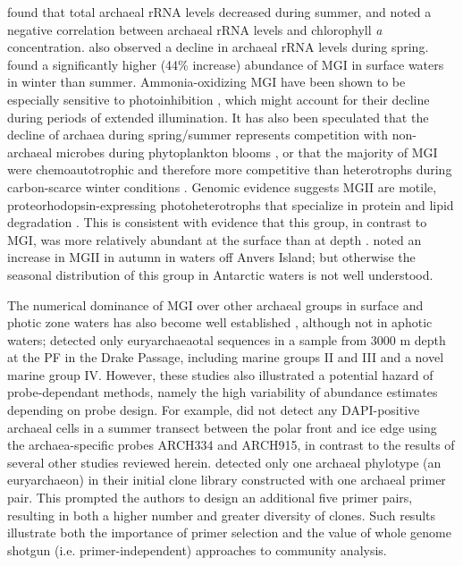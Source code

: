 \citet{Murray:1998wy} found that total archaeal rRNA levels decreased during summer, and noted a negative correlation between archaeal rRNA levels and chlorophyll \emph{a} concentration.
\citet{Massana:1998tn} also observed a decline in archaeal rRNA levels during spring.
\citet{Church:2003vt} found a significantly higher (44\% increase) abundance of \ac{MGI} in surface waters in winter than summer.
Ammonia-oxidizing \ac{MGI} have been shown to be especially sensitive to photoinhibition \cite{Merbt:2011bl}, which might account for their decline during periods of extended illumination.
It has also been speculated that the decline of archaea during spring/summer represents competition with non-archaeal microbes during phytoplankton blooms \cite{Massana:1998tn}, or that the majority of \ac{MGI} were chemoautotrophic and therefore more competitive than heterotrophs during carbon-scarce winter conditions \cite{Murray:1998wy}.
Genomic evidence suggests \ac{MGII} are motile, proteorhodopsin-expressing photoheterotrophs that specialize in protein and lipid degradation \cite{Iverson:2012kc}.
This is consistent with evidence that this group, in contrast to \ac{MGI}, was more relatively abundant at the surface than at depth \cite{Massana:1998tn}.
\citet{Murray:1998wy} noted an increase in \ac{MGII} in autumn in waters off Anvers Island; but otherwise the seasonal distribution of this group in Antarctic waters is not well understood.

The numerical dominance of \ac{MGI} over other archaeal groups in surface and photic zone waters has also become well established \citep[e.g.][]{DeLong:1994id,Massana:2000bg}, although not in aphotic waters; \citet{LopezGarcia:2001vp} detected only euryarchaeaotal sequences in a sample from 3000 m depth at the \ac{PF} in the Drake Passage, including marine groups II and III and a novel marine group IV.
However, these studies also illustrated a potential hazard of probe-dependant methods, namely the high variability of abundance estimates depending on probe design.
For example, \cite{Simon:1999ux} did not detect any DAPI-positive archaeal cells in a summer transect between the polar front and ice edge using the archaea-specific probes ARCH334 and ARCH915, in contrast to the results of several other studies reviewed herein.
\citet{LopezGarcia:2001vp} detected only one archaeal phylotype (an euryarchaeon) in their initial clone library constructed with one archaeal primer pair.
This prompted the authors to design an additional five primer pairs, resulting in both a higher number and greater diversity of clones.
Such results illustrate both the importance of primer selection and the value of whole genome shotgun (i.e. primer-independent) approaches to community analysis.

